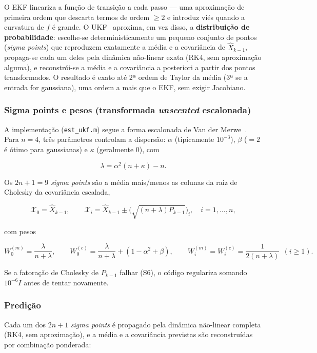 \documentclass[brazil, 12pt]{article}
\begin{document}
O EKF lineariza a função de transição a cada passo — uma aproximação de
primeira ordem que descarta termos de ordem $\geq 2$ e introduz viés quando a
curvatura de $f$ é grande. O UKF~\cite{wan2000} aproxima,
em vez disso, a \textbf{distribuição de probabilidade}: escolhe-se
deterministicamente um pequeno conjunto de pontos (\emph{sigma points}) que
reproduzem exatamente a média e a covariância de $\hat X_{k-1}$, propaga-se
cada um deles pela dinâmica não-linear exata (RK4, sem aproximação alguma), e
reconstrói-se a média e a covariância a posteriori a partir dos pontos
transformados. O resultado é exato até 2ª ordem de Taylor da média (3ª se a
entrada for gaussiana), uma ordem a mais que o EKF, sem exigir Jacobiano.

\subsubsection{Sigma points e pesos (transformada \emph{unscented} escalonada)}

A implementação (\texttt{est\_ukf.m}) segue a forma escalonada de Van der
Merwe~\cite{wan2000}. Para $n=4$, três parâmetros controlam a dispersão:
$\alpha$ (tipicamente $10^{-3}$), $\beta$ ($=2$ é ótimo para gaussianas) e
$\kappa$ (geralmente $0$), com

\[
\lambda = \alpha^2(n+\kappa) - n.
\]

Os $2n+1=9$ \emph{sigma points} são a média mais/menos as colunas da raiz de
Cholesky da covariância escalada,

\[
\mathcal{X}_0 = \hat X_{k-1},
\qquad
\mathcal{X}_i = \hat X_{k-1} \pm \Big(\sqrt{(n+\lambda)P_{k-1}}\Big)_i,
\quad i=1,\dots,n,
\]

com pesos

\[
W_0^{(m)} = \frac{\lambda}{n+\lambda}, \qquad
W_0^{(c)} = \frac{\lambda}{n+\lambda} + (1-\alpha^2+\beta), \qquad
W_i^{(m)} = W_i^{(c)} = \frac{1}{2(n+\lambda)}\ \ (i\geq1).
\]

Se a fatoração de Cholesky de $P_{k-1}$ falhar (S6), o código regulariza
somando $10^{-6}I$ antes de tentar novamente.

\subsubsection{Predição}

Cada um dos $2n+1$ \emph{sigma points} é propagado pela dinâmica não-linear
completa (RK4, sem aproximação), e a média e a covariância previstas são
reconstruídas por combinação ponderada:
\end{document}
